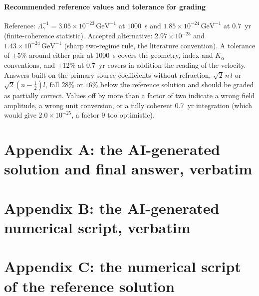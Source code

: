 \paragraph*{Recommended reference values and tolerance for grading}
Reference: $\Lambda_\gamma^{-1}=3.05\times10^{-23}\,\mathrm{GeV}^{-1}$ at $1000$~s and $1.85\times10^{-24}\,\mathrm{GeV}^{-1}$ at $0.7$~yr (finite-coherence statistic). Accepted alternative: $2.97\times10^{-23}$ and $1.43\times10^{-24}\,\mathrm{GeV}^{-1}$ (sharp two-regime rule, the literature convention). A tolerance of $\pm5\%$ around either pair at $1000$~s covers the geometry, index and $K_\alpha$ conventions, and $\pm12\%$ at $0.7$~yr covers in addition the reading of the velocity. Answers built on the primary-source coefficients without refraction, $\sqrt2\,n\,l$ or $\sqrt2(n-\tfrac12)l$, fall $28\%$ or $16\%$ below the reference solution and should be graded as partially correct. Values off by more than a factor of two indicate a wrong field amplitude, a wrong unit conversion, or a fully coherent $0.7$~yr integration (which would give $2.0\times10^{-25}$, a factor $9$ too optimistic).

\clearpage
\section*{Appendix A: the AI-generated solution and final answer, verbatim}
\begingroup
\small


\endgroup

\clearpage
\section*{Appendix B: the AI-generated numerical script, verbatim}



\clearpage
\section*{Appendix C: the numerical script of the reference solution}

